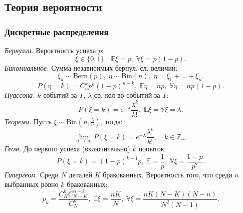 \subsection{Теория вероятности}
\subsubsection{Дискретные распределения}
\textit{Бернулли.} Вероятность успеха $p$:
$$\xi\in\{0,1\}\quad \mathbb{E}\xi=p,\;\mathbb{V}\xi=p(1-p).$$
\textit{Биномиальное.} Сумма независимых бернул. сл. величин:
$$\xi_k\sim\text{Bern}(p),\;\eta\sim\text{Bin}(n),\;\eta=\xi_1+\dots+\xi_n.$$
$$P(\eta=k)=C_n^kp^k(1-p)^{n-k},\;\mathbb{E}\eta=np,\;\mathbb{V}\eta=np(1-p).$$
\textit{Пуассона.} $k$ событий за $T$, $\lambda$ ср. кол-во событий за $T$:
$$P(\xi=k)=e^{-\lambda}\dfrac{\lambda^k}{k!},\;\mathbb{E}\xi=\mathbb{V}\xi=\lambda.$$
\textit{Теорема.} Пусть $\xi\sim\text{Bin}(n,\frac{\lambda}{n})$, тогда:
$$\displaystyle\lim_{n\to\infty}P(\xi=k)=e^{-\lambda}\dfrac{\lambda^k}{k!},\quad k\in\mathbb{Z}_+.$$
\textit{Геом.} До первого успеха (включительно) $k$ попыток:
$$P(\xi=k)=(1-p)^{k-1}p,\;\mathbb{E}=\dfrac{1}{p},\;\mathbb{V}\xi=\dfrac{1-p}{p^2}.$$
\textit{Гипергеом.} Среди $N$ деталей $K$ бракованных. Вероятность того, что среди $n$ выбранных ровно $k$ бракованных:
$$p_k=\dfrac{C_K^kC_{N-K}^{n-k}}{C_N^n},\;\mathbb{E}\xi=\dfrac{nK}{N},\;\mathbb{V}\xi=\dfrac{nK(N-K)(N-n)}{N^2(N-1)}.$$